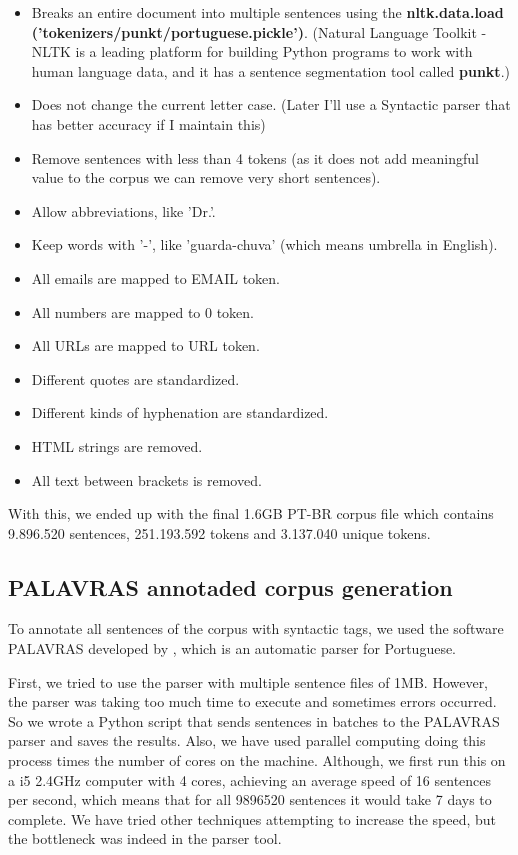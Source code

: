 \begin{itemize}
    \item Breaks an entire document into multiple sentences using the 
    \textbf{nltk.data.load ('tokenizers/punkt/portuguese.pickle')}. (Natural Language Toolkit - NLTK is a leading platform for building Python programs to work with human language data, and it has a sentence segmentation tool called \textbf{punkt}.)
    \item Does not change the current letter case. (Later I'll use a Syntactic parser that has better accuracy if I maintain this)
    \item Remove sentences with less than 4 tokens (as it does not add meaningful value to the corpus we can remove very short sentences).
    \item Allow abbreviations, like 'Dr.'.
    \item Keep words with '-', like 'guarda-chuva' (which means umbrella in English).
    \item All emails are mapped to EMAIL token.
    \item All numbers are mapped to 0 token.
    \item All URLs are mapped to URL token.
    \item Different quotes are standardized.
    \item Different kinds of hyphenation are standardized.
    \item HTML strings are removed.
    \item All text between brackets is removed.
\end{itemize}

With this, we ended up with the final 1.6GB PT-BR corpus file which contains 9.896.520 sentences, 251.193.592 tokens and 3.137.040 unique tokens.

\subsection{PALAVRAS annotaded corpus generation}

To annotate all sentences of the corpus with syntactic tags, we used the software PALAVRAS developed by , which is an automatic parser for Portuguese.

First, we tried to use the parser with multiple sentence files of 1MB. However, the parser was taking too much time to execute and sometimes errors occurred. So we wrote a Python script that sends sentences in batches to the PALAVRAS parser and saves the results. Also, we have used parallel computing doing this process times the number of cores on the machine. Although, we first run this on a i5 2.4GHz computer with 4 cores, achieving an average speed of 16 sentences per second, which means that for all 9896520 sentences it would take 7 days to complete. We have tried other techniques attempting to increase the speed, but the bottleneck was indeed in the parser tool. 

